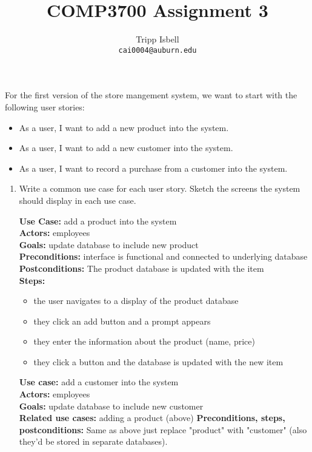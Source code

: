 \documentclass[notitlepage, 11pt]{report}
\title{COMP3700 Assignment 3}
\author{Tripp Isbell\\
	\texttt{cai0004@auburn.edu}}
\date{}
\begin{document}
\maketitle
For the first version of the store mangement system, we want to start with the following user stories:
\begin{itemize}
	\item As a user, I want to add a new product into the system.
	\item As a user, I want to add a new customer into the system.
	\item As a user, I want to record a purchase from a customer into the system.
\end{itemize}
\begin{enumerate}[itemindent=-1.5em]
	\item Write a common use case for each user story. Sketch the screens the system should display in each use case.
	
	\textbf{Use Case:} add a product into the system\\
	\textbf{Actors:} employees\\
	\textbf{Goals:} update database to include new product\\
	\textbf{Preconditions:} interface is functional and connected to underlying database\\
	\textbf{Postconditions:} The product database is updated with the item\\
	\textbf{Steps:}
		\begin{itemize}
		\item the user navigates to a display of the product database
		\item they click an add button and a prompt appears
		\item they enter the information about the product (name, price)
		\item they click a button and the database is updated with the new item
		\end{itemize}
		
	\textbf{Use case:} add a customer into the system\\
	\textbf{Actors:} employees\\
	\textbf{Goals:} update database to include new customer\\
	\textbf{Related use cases:} adding a product (above)
	\textbf{Preconditions, steps, postconditions:} Same as above just replace "product" with "customer" (also they'd be stored in separate databases).
	

\end{enumerate}
\end{document}
